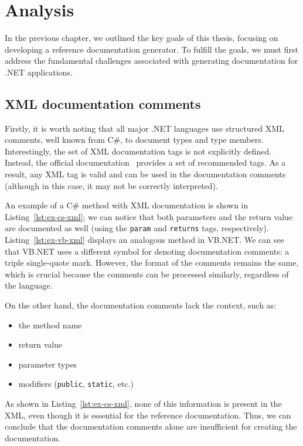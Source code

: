 \chapter{Analysis}
\label{ch:second}

In the previous chapter, we outlined the key goals of this thesis, focusing on developing a reference documentation generator. 
To fulfill the goals, we must first address the fundamental challenges associated with generating documentation for .NET applications.

\section{XML documentation comments}

Firstly, it is worth noting that all major .NET languages use structured XML comments, well known from C\#, to document types and type members.
Interestingly, the set of XML documentation tags is not explicitly defined.
Instead, the official documentation~\cite{csharp_xml_tags_docs} provides a set of recommended tags.
As a result, any XML tag is valid and can be used in the documentation comments 
(although in this case, it may not be correctly interpreted).

An example of a C\# method with XML documentation is shown in Listing~\ref{lst:ex-cs-xml}; 
we can notice that both parameters and the return value are documented as well (using the \texttt{param} and \texttt{returns} tags, respectively).
Listing~\ref{lst:ex-vb-xml} displays an analogous method in VB.NET.
We can see that VB.NET uses a different symbol for denoting documentation comments: a triple single-quote mark.
However, the format of the comments remains the same, which is crucial because the comments can be processed similarly, regardless of the language.

On the other hand, the documentation comments lack the context, such as:
\begin{itemize}
    \item the method name
    \item return value
    \item parameter types
    \item modifiers (\texttt{public}, \texttt{static}, etc.)
\end{itemize}

As shown in Listing~\ref{lst:ex-cs-xml}, none of this information is present in the XML, even though it is essential for the reference documentation.
Thus, we can conclude that the documentation comments alone are insufficient for creating the documentation. 

